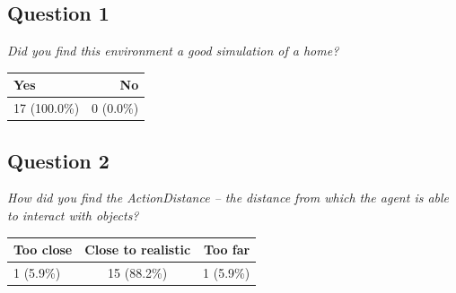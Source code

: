 \subsection{Question 1}\label{question1:1}
\emph{Did you find this environment a good simulation of a home?}
\begin{table}[H]
	\begin{center}
		\small \begin{tabular*}{0.35\columnwidth}{lr}
			\\ \hline \hline
			Yes & No \\ \hline \hline

		 	17 (100.0\%) & 0 (0.0\%)\\ \hline
		\end{tabular*}
	\end{center}
\end{table}

\subsection{Question 2}\label{question1:2}
\emph{How did you find the ActionDistance -- the distance from which the agent is able to interact with objects?}
\begin{table}[H]
	\begin{center}
		\small \begin{tabular*}{0.6\columnwidth}{lcr}
			\\ \hline \hline
			Too close & Close to realistic & Too far \\ \hline \hline

		 	1 (5.9\%) & 15 (88.2\%) & 1 (5.9\%)\\ \hline
		\end{tabular*}
	\end{center}
\end{table}

